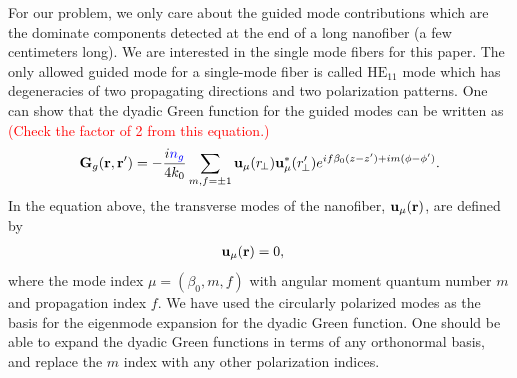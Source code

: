 \documentclass[preprint,aps,pra,onecolumn]{revtex4-1} %
\begin{document}
For our problem, we only care about the guided mode contributions which are the dominate components detected at the end of a long nanofiber (a few centimeters long). We are interested in the single mode fibers for this paper. The only allowed guided mode for a single-mode fiber is called \textit{$\mathrm{HE}_{11}$} mode which has degeneracies of two propagating directions and two polarization patterns. One can show that the dyadic Green function for the guided modes can be written as \textcolor{red}{(Check the factor of 2 from this equation.)}
\begin{align}
\mathbf{G}_g(\mathbf{r},\mathbf{r}') = -\frac{i\mathbin{\color{blue}{n_g}}}{4k_0} \sum_{m,f=\pm 1} \mathbf{u}_{\mu}(r\!_\perp)\mathbf{u}^*_{\mu}(r_{\!\perp}^\prime)e^{if\beta_0(z-z')+im(\phi-\phi')}.
\end{align}
In the equation above, the transverse modes of the nanofiber, $\mathbf{u}_{\mu}(\mathbf{r})$, are defined by
\begin{align}
[-\nabla\times\nabla + \frac{\omega_{\mu}^2}{c^2}n^2(\br)]  \mathbf{u}_{\mu}(\br) &=0,
\end{align}
where the mode index $\mu=(\beta_0,m,f)$ with angular moment quantum number $ m $ and propagation index $ f $. We have used the circularly polarized modes as the basis for the eigenmode expansion for the dyadic Green function. One should be able to expand the dyadic Green functions in terms of any orthonormal basis, and replace the $m$ index with any other polarization indices. 
\end{document}

